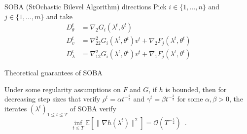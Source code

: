 \documentclass{beamer}
\begin{document}
\begin{frame}{SOBA (StOchastic Bilevel Algorithm) directions}
    Pick $i\in\{1,\dots,n\}$ and $j\in\{1,\dots,m\}$ and take
    \vspace{.5cm}
    \begin{align*}
        D_\theta^t &= \nabla_2 G_i(\lambda^t, \theta^t) \\
        D_v^t &= \nabla^2_{22} G_i(\lambda^t, \theta^t)v^t + \nabla_2 F_j(\lambda^t, \theta^t) \\
        D_\lambda^t &= \nabla^2_{12} G_i(\lambda^t, \theta^t)v^t + \nabla_1 F_j(\lambda^t, \theta^t)
    \end{align*}
\end{frame}


\begin{frame}{Theoretical guarantees of SOBA}
    \begin{theorem}
        Under some regularity assumptions on $F$ and $G$, if $h$ is bounded, then for decreasing step sizes that verify $\rho^t = \alpha t^{-\frac25}$ and $\gamma^t = \beta t^{-\frac35}$ for some $\alpha, \beta>0$, the iterates $(\lambda^t)_{1\leq t\leq T}$ of SOBA verify
        $$
        \inf_{t\leq T} \mathbb E[\|\nabla h(\lambda^t)\|^2] = \mathcal O(T^{-\frac12})\enspace .
        $$
    \end{theorem}
\end{frame}
\end{document}

